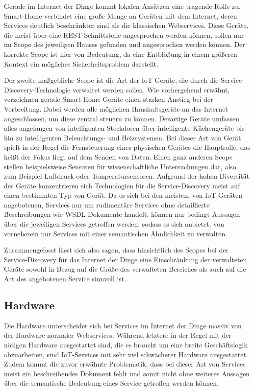 \documentclass[conference,compsoc]{IEEEtran}
\begin{document}
Gerade im Internet der Dinge kommt lokalen Ansätzen eine tragende Rolle zu. Smart-Home verbindet eine große Menge an Geräten mit dem Internet, deren Services deutlich beschränkter sind als die klassischen Webservices. Diese Geräte, die meist über eine REST-Schnittstelle angesprochen werden können, sollen nur im Scope des jeweiligen Hauses gefunden und angesprochen werden können. Der korrekte Scope ist hier von Bedeutung, da eine Entblößung in einem größeren Kontext ein mögliches Sicherheitsproblem darstellt.

Der zweite maßgebliche Scope ist die Art der IoT-Geräte, die durch die Service-Discovery-Technologie verwaltet werden sollen. Wie vorhergehend erwähnt, verzeichnen gerade Smart-Home-Geräte einen starken Anstieg bei der Verbreitung. Dabei werden alle möglichen Haushaltsgeräte an das Internet angeschlossen, um diese zentral steuern zu können. Derartige Geräte umfassen alles angefangen von intelligenten Steckdosen über intelligente Küchengeräte bis hin zu intelligenten Beleuchtungs- und Heizsystemen. Bei dieser Art von Gerät spielt in der Regel die Fernsteuerung eines physischen Gerätes die Hauptrolle, das heißt der Fokus liegt auf dem Senden von Daten. Einen ganz anderen Scope stellen beispielsweise Sensoren für wissenschaftliche Untersuchungen dar, also zum Beispiel Luftdruck oder Temperatursensoren. Aufgrund der hohen Diversität der Geräte konzentrieren sich Technologien für die Service-Discovery meist auf einen bestimmten Typ von Gerät. Da es sich bei den meisten, von IoT-Geräten angebotenen, Services nur um rudimentäre Services ohne detaillierte Beschreibungen wie WSDL-Dokumente handelt, können nur bedingt Aussagen über die jeweiligen Services getroffen werden, sodass es sich anbietet, von vorneherein nur Services mit einer semantischen Ähnlichkeit zu verwalten.

Zusammengefasst lässt sich also sagen, dass hinsichtlich des Scopes bei der Service-Discovery für das Internet der Dinge eine Einschränkung der verwalteten Geräte sowohl in Bezug auf die Größe des verwalteten Bereiches als auch auf die Art des angebotenen Service sinnvoll ist.

\subsection{Hardware} \label{Hardware}

Die Hardware unterscheidet sich bei Services im Internet der Dinge massiv von der Hardware normaler Webservices. Während letztere in der Regel mit der nötigen Hardware ausgestattet sind, die es braucht um eine breite Geschäftslogik abzuarbeiten, sind IoT-Services mit sehr viel schwächerer Hardware ausgestattet. Zudem kommt die zuvor erwähnte Problematik, dass bei dieser Art von Services meist ein beschreibendes Dokument fehlt und somit nicht ohne weiteres Aussagen über die semantische Bedeutung eines Service getroffen werden können.
\end{document}
